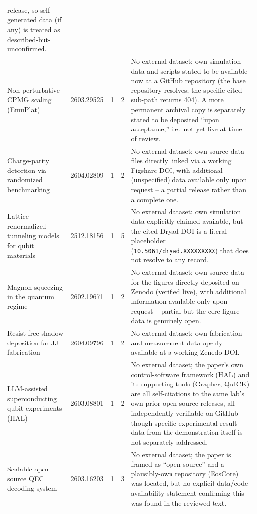 \documentclass[11pt]{article}
\begin{document}
\begin{longtable}{@{}p{4.3cm} p{1.3cm} c c p{5.3cm}@{}}
release, so self-generated data (if any) is treated as described-but-unconfirmed. \\
\addlinespace
Non-perturbative CPMG scaling (EmuPlat) & 2603.29525 & 1 & 2 &
No external dataset; own simulation data and scripts stated to be available now at a
GitHub repository (the base repository resolves; the specific cited sub-path returns
404). A more permanent archival copy is separately stated to be deposited ``upon
acceptance,'' i.e.\ not yet live at time of review. \\
\addlinespace
Charge-parity detection via randomized benchmarking & 2604.02809 & 1 & 2 &
No external dataset; own source data files directly linked via a working Figshare DOI,
with additional (unspecified) data available only upon request -- a partial release
rather than a complete one. \\
\addlinespace
Lattice-renormalized tunneling models for qubit materials & 2512.18156 & 1 & 5 &
No external dataset; own simulation data explicitly claimed available, but the cited
Dryad DOI is a literal placeholder (\texttt{10.5061/dryad.XXXXXXXXX}) that does not
resolve to any record. \\
\addlinespace
Magnon squeezing in the quantum regime & 2602.19671 & 1 & 2 &
No external dataset; own source data for the figures directly deposited on Zenodo
(verified live), with additional information available only upon request -- partial
but the core figure data is genuinely open. \\
\addlinespace
Resist-free shadow deposition for JJ fabrication & 2604.09796 & 1 & 2 &
No external dataset; own fabrication and measurement data openly available at a
working Zenodo DOI. \\
\addlinespace
LLM-assisted superconducting qubit experiments (HAL) & 2603.08801 & 1 & 2 &
No external dataset; the paper's own control-software framework (HAL) and its
supporting tools (Grapher, QuICK) are all self-citations to the same lab's own prior
open-source releases, all independently verifiable on GitHub -- though specific
experimental-result data from the demonstration itself is not separately addressed. \\
\addlinespace
Scalable open-source QEC decoding system & 2603.16203 & 1 & 3 &
No external dataset; the paper is framed as ``open-source'' and a plausibly-own
repository (EosCore) was located, but no explicit data/code availability statement
confirming this was found in the reviewed text. \\

\end{longtable}
\end{document}
